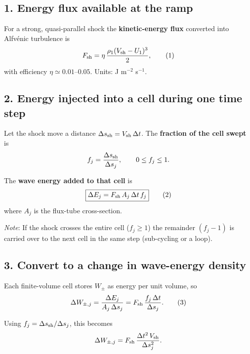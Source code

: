 \subsection*{1. Energy flux available at the ramp}

For a strong, quasi-parallel shock the \textbf{kinetic-energy flux} converted into Alfvénic turbulence is
\begin{equation}
F_{\rm sh} = 
\eta\,\frac{\rho_{1}(V_{\rm sh}-U_{1})^{3}}{2},
\tag{1}
\end{equation}
with efficiency $\eta\simeq 0.01$–$0.05$. Units: J m$^{-2}$ s$^{-1}$.

\subsection*{2. Energy injected into a cell during one time step}

Let the shock move a distance $\Delta s_{\rm sh}=V_{\rm sh}\,\Delta t$. The \textbf{fraction of the cell swept} is
\begin{equation}
f_j = \frac{\Delta s_{\rm sh}}{\Delta s_j}, \qquad 0 \le f_j \le 1.
\end{equation}

The \textbf{wave energy added to that cell} is
\begin{equation}
\boxed{
\Delta E_j = F_{\rm sh} \, A_j \, \Delta t \, f_j
}
\tag{2}
\end{equation}
where $A_j$ is the flux-tube cross-section.

\emph{Note}: If the shock crosses the entire cell ($f_j \ge 1$) the remainder $(f_j - 1)$ is carried over to the next cell in the same step (sub-cycling or a loop).

\subsection*{3. Convert to a change in wave-energy \textbf{density}}

Each finite-volume cell stores $W_\pm$ as energy per unit volume, so
\begin{equation}
\Delta W_{\pm,j} = 
\frac{\Delta E_j}{A_j \, \Delta s_j}
= F_{\rm sh}\,\frac{f_j\,\Delta t}{\Delta s_j}.
\tag{3}
\end{equation}

Using $f_j = \Delta s_{\rm sh}/\Delta s_j$, this becomes
\begin{equation}
\Delta W_{\pm,j}
= F_{\rm sh}\,\frac{\Delta t^2 \, V_{\rm sh}}{\Delta s_j^2}.
\end{equation}

